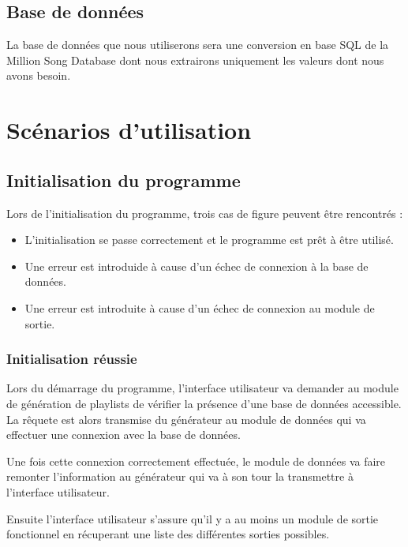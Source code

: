 \documentclass[11pt,a4paper]{article}
\begin{document}
\subsection{Base de données}

La base de données que nous utiliserons sera une conversion en base SQL de la
Million Song Database dont nous extrairons uniquement les valeurs dont nous
avons besoin.
    
\newpage

\section{Scénarios d'utilisation}

\subsection{Initialisation du programme}
    
Lors de l'initialisation du programme, trois cas de figure peuvent être
rencontrés : 

\begin{itemize}
\item L'initialisation se passe correctement et le programme est prêt à être
utilisé.
\item Une erreur est introduide à cause d'un échec de connexion à la base de
données.
\item Une erreur est introduite à cause d'un échec de connexion au module de
sortie.
\end{itemize}

\subsubsection{Initialisation réussie}

Lors du démarrage du programme, l'interface utilisateur va demander au module de
génération de playlists de vérifier la présence d'une base de données accessible.
La rêquete est alors transmise du générateur au module de données qui va
effectuer une connexion avec la base de données.
        
Une fois cette connexion correctement effectuée, le module de données va faire
remonter l'information au générateur qui va à son tour la transmettre à
l'interface utilisateur.

Ensuite l'interface utilisateur s'assure qu'il y a au moins un module de sortie
fonctionnel en récuperant une liste des différentes sorties possibles.
\end{document}
